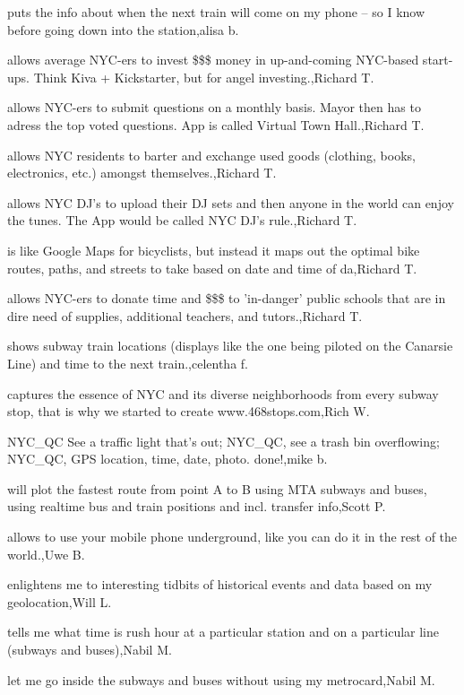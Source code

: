 \documentclass{article}
\begin{document}
puts the info about when the next train will come on my phone -- so I know before going down into the station,alisa b.

allows average NYC-ers to invest \$\$\$ money in up-and-coming NYC-based start-ups. Think Kiva + Kickstarter, but for angel investing.,Richard T.

allows NYC-ers to submit questions on a monthly basis. Mayor then has to adress the top voted questions. App is called Virtual Town Hall.,Richard T.

allows NYC residents to barter and exchange used goods (clothing, books, electronics, etc.) amongst themselves.,Richard T.

allows NYC DJ's to upload their DJ sets and then anyone in the world can enjoy the tunes. The App would be called NYC DJ's rule.,Richard T.

 is like Google Maps for bicyclists, but instead it maps out the optimal bike routes, paths, and streets to take based on date and time of da,Richard T.

allows NYC-ers to donate time and \$\$\$ to 'in-danger' public schools that are in dire need of supplies, additional teachers, and tutors.,Richard T.

shows subway train locations (displays like the one being piloted on the Canarsie Line) and time to the next train.,celentha f.

captures the essence of NYC and its diverse neighborhoods from every subway stop, that is why we started to create  www.468stops.com,Rich W.

 NYC\_QC  See a traffic light that's out; NYC\_QC, see a trash bin overflowing; NYC\_QC,  GPS location, time, date, photo. done!,mike b.

will plot the fastest route from point A to B using MTA subways and buses, using realtime bus and train positions and incl. transfer info,Scott P.

allows to use your mobile phone underground, like you can do it in the rest of the world.,Uwe B.

enlightens me to interesting tidbits of historical events and data based on my geolocation,Will L.

tells me what time is rush hour at a particular station and on a particular line (subways and buses),Nabil M.

let me go inside the subways and buses without using my metrocard,Nabil M.
\end{document}
